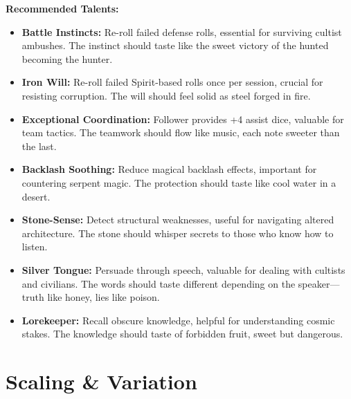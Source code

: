 \documentclass[11pt]{article}
\begin{document}
\textbf{Recommended Talents:}
\begin{itemize}
\item \textbf{Battle Instincts:} Re-roll failed defense rolls, essential for surviving cultist ambushes. The instinct should taste like the sweet victory of the hunted becoming the hunter.
\item \textbf{Iron Will:} Re-roll failed Spirit-based rolls once per session, crucial for resisting corruption. The will should feel solid as steel forged in fire.
\item \textbf{Exceptional Coordination:} Follower provides +4 assist dice, valuable for team tactics. The teamwork should flow like music, each note sweeter than the last.
\item \textbf{Backlash Soothing:} Reduce magical backlash effects, important for countering serpent magic. The protection should taste like cool water in a desert.
\item \textbf{Stone-Sense:} Detect structural weaknesses, useful for navigating altered architecture. The stone should whisper secrets to those who know how to listen.
\item \textbf{Silver Tongue:} Persuade through speech, valuable for dealing with cultists and civilians. The words should taste different depending on the speaker—truth like honey, lies like poison.
\item \textbf{Lorekeeper:} Recall obscure knowledge, helpful for understanding cosmic stakes. The knowledge should taste of forbidden fruit, sweet but dangerous.
\end{itemize}

\section{Scaling \& Variation}
\end{document}
